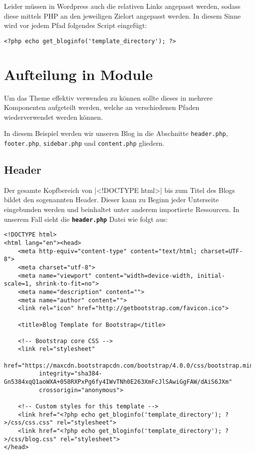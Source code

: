 \documentclass[minted]{school}
\begin{document}
Leider müssen in Wordpress auch die relativen Links angepasst werden, sodass diese mittels PHP an den jeweiligen Zielort angepasst werden. In diesem Sinne wird vor jedem Pfad folgendes Script eingefügt:
\begin{verbatim}
<?php echo get_bloginfo('template_directory'); ?>
\end{verbatim}

\newpage
\section{Aufteilung in Module}
Um das Theme effektiv verwenden zu können sollte dieses in mehrere Komponenten aufgeteilt werden, welche an verschiedenen Pfaden wiederverwendet werden können.

In diesem Beispiel werden wir unseren Blog in die Abschnitte \verb|header.php|, \verb|footer.php|, \verb|sidebar.php| und \verb|content.php| gliedern.

\subsection{Header}
Der gesamte Kopfbereich von |<!DOCTYPE html>| bis zum Titel des Blogs bildet den sogenannten Header. Dieser kann zu Beginn jeder Unterseite eingebunden werden und beinhaltet unter anderem importierte Ressourcen. In unserem Fall sieht die \textbf{\texttt{header.php}} Datei wie folgt aus:

\begin{verbatim}
<!DOCTYPE html>
<html lang="en"><head>
    <meta http-equiv="content-type" content="text/html; charset=UTF-8">
    <meta charset="utf-8">
    <meta name="viewport" content="width=device-width, initial-scale=1, shrink-to-fit=no">
    <meta name="description" content="">
    <meta name="author" content="">
    <link rel="icon" href="http://getbootstrap.com/favicon.ico">

    <title>Blog Template for Bootstrap</title>

    <!-- Bootstrap core CSS -->
    <link rel="stylesheet"
          href="https://maxcdn.bootstrapcdn.com/bootstrap/4.0.0/css/bootstrap.min.css"
          integrity="sha384-Gn5384xqQ1aoWXA+058RXPxPg6fy4IWvTNh0E263XmFcJlSAwiGgFAW/dAiS6JXm"
          crossorigin="anonymous">

    <!-- Custom styles for this template -->
    <link href="<?php echo get_bloginfo('template_directory'); ?>/css/css.css" rel="stylesheet">
    <link href="<?php echo get_bloginfo('template_directory'); ?>/css/blog.css" rel="stylesheet">
</head>
\end{verbatim}
\end{document}
